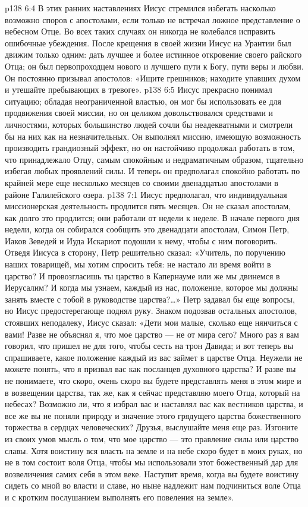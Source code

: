 \vs p138 6:4 В этих ранних наставлениях Иисус стремился избегать насколько возможно споров с апостолами, если только не встречал ложное представление о небесном Отце. Во всех таких случаях он никогда не колебался исправить ошибочные убеждения. После крещения в своей жизни Иисус на Урантии был движим только одним: дать лучшее и более истинное откровение своего райского Отца; он был первопроходцем нового и лучшего пути к Богу, пути веры и любви. Он постоянно призывал апостолов: «Ищите грешников; находите упавших духом и утешайте пребывающих в тревоге».
\vs p138 6:5 Иисус прекрасно понимал ситуацию; обладая неограниченной властью, он мог бы использовать ее для продвижения своей миссии, но он целиком довольствовался средствами и личностями, которых большинство людей сочли бы неадекватными и смотрели бы на них как на незначительных. Он выполнял миссию, имеющую возможность производить грандиозный эффект, но он настойчиво продолжал работать в том, что принадлежало Отцу, самым спокойным и недраматичным образом, тщательно избегая любых проявлений силы. И теперь он предполагал спокойно работать по крайней мере еще несколько месяцев со своими двенадцатью апостолами в районе Галилейского озера.
\vs p138 7:1 Иисус предполагал, что индивидуальная миссионерская деятельность продлится пять месяцев. Он не сказал апостолам, как долго это продлится; они работали от недели к неделе. В начале первого дня недели, когда он собирался сообщить это двенадцати апостолам, Симон Петр, Иаков Зеведей и Иуда Искариот подошли к нему, чтобы с ним поговорить. Отведя Иисуса в сторону, Петр решительно сказал: «Учитель, по поручению наших товарищей, мы хотим спросить тебя: не настало ли время войти в царство? И провозгласишь ты царство в Капернауме или же мы двинемся в Иерусалим? И когда мы узнаем, каждый из нас, положение, которое мы должны занять вместе с тобой в руководстве царства?\ldots » Петр задавал бы еще вопросы, но Иисус предостерегающе поднял руку. Знаком подозвав остальных апостолов, стоявших неподалеку, Иисус сказал: «Дети мои малые, сколько еще нянчиться с вами! Разве не объяснял я, что мое царство --- не от мира сего? Много раз я вам говорил, что пришел не для того, чтобы сесть на трон Давида; и вот теперь вы спрашиваете, какое положение каждый из вас займет в царстве Отца. Неужели не можете понять, что я призвал вас как посланцев духовного царства? И разве вы не понимаете, что скоро, очень скоро вы будете представлять меня в этом мире и в возвещении царства, так же, как я сейчас представляю моего Отца, который на небесах? Возможно ли, что я избрал вас и наставлял вас как вестников царства, и все же вы не поняли природу и значение этого грядущего царства божественного торжества в сердцах человеческих? Друзья, выслушайте меня еще раз. Изгоните из своих умов мысль о том, что мое царство --- это правление силы или царство славы. Хотя воистину вся власть на земле и на небе скоро будет в моих руках, но не в том состоит воля Отца, чтобы мы использовали этот божественный дар для возвеличения самих себя в этом веке. Наступит время, когда вы будете воистину сидеть со мной во власти и славе, но ныне надлежит нам подчиниться воле Отца и с кротким послушанием выполнять его повеления на земле».
